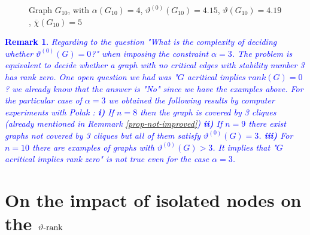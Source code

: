 \documentclass[11pt]{article}
\newtheorem{remark}[theorem]{Remark}
\numberwithin{equation}{section}
\newcommand{\rrank}{\vartheta\text{\rm -rank}}
\begin{document}
{{\begin{figure}
		\caption{Graph $G_{10}$, with $\alpha(G_{10})=4$, $\vartheta^{(0)}(G_{10})=4.15$, $\vartheta(G_{10})=4.19$, $\overline{\chi}(G_{10})=5$}\label{fig-G10}
	\end{figure}
}
\textcolor{blue}{
	\begin{remark}
		Regarding to the question "What is the complexity of deciding whether $\vartheta^{(0)}(G)=0$?" when imposing the constraint $\alpha=3$. The problem is equivalent to decide whether a graph with no critical edges with stability number 3 has rank zero. One open question we had was "$G$ acritical implies $rank(G)=0$? we already know that the answer is "No" since we have the examples above. For the particular case of $\alpha=3$ we obtained the following results  by computer experiments with Polak \cite{Polak}: {\bf{i)}} If $n=8$ then the graph is covered by 3 cliques (already mentioned in Remmark \ref{prop-not-improved}) {\bf{ii)}} If $n=9$ there exist graphs not covered by 3 cliques but all of them satisfy $\vartheta^{(0)}(G)=3$. {\bf{iii)}} For $n=10$ there are examples of graphs with $\vartheta^{(0)}(G)>3$. It implies that "$G$ acritical implies rank zero" is not true even for the case $\alpha=3$.
	\end{remark}
}
}





\section{On the impact of isolated nodes on the $\rrank$}\label{sec-k1}
\end{document}
